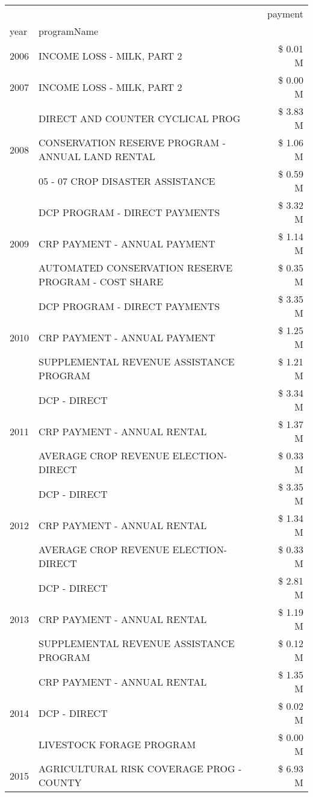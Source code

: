 \begin{tabular}{llr}
\toprule
 &  & payment \\
year & programName &  \\
\midrule
2006 & INCOME LOSS - MILK, PART 2 & \$ 0.01 M \\
\cline{1-3}
2007 & INCOME LOSS - MILK, PART 2 & \$ 0.00 M \\
\cline{1-3}
\multirow[t]{3}{*}{2008} & DIRECT AND COUNTER CYCLICAL PROG & \$ 3.83 M \\
 & CONSERVATION RESERVE PROGRAM - ANNUAL LAND RENTAL & \$ 1.06 M \\
 & 05 - 07 CROP DISASTER ASSISTANCE & \$ 0.59 M \\
\cline{1-3}
\multirow[t]{3}{*}{2009} & DCP PROGRAM - DIRECT PAYMENTS & \$ 3.32 M \\
 & CRP PAYMENT - ANNUAL PAYMENT & \$ 1.14 M \\
 & AUTOMATED CONSERVATION RESERVE PROGRAM - COST SHARE & \$ 0.35 M \\
\cline{1-3}
\multirow[t]{3}{*}{2010} & DCP PROGRAM - DIRECT PAYMENTS & \$ 3.35 M \\
 & CRP PAYMENT - ANNUAL PAYMENT & \$ 1.25 M \\
 & SUPPLEMENTAL REVENUE ASSISTANCE PROGRAM & \$ 1.21 M \\
\cline{1-3}
\multirow[t]{3}{*}{2011} & DCP - DIRECT & \$ 3.34 M \\
 & CRP PAYMENT - ANNUAL RENTAL & \$ 1.37 M \\
 & AVERAGE CROP REVENUE ELECTION-DIRECT & \$ 0.33 M \\
\cline{1-3}
\multirow[t]{3}{*}{2012} & DCP - DIRECT & \$ 3.35 M \\
 & CRP PAYMENT - ANNUAL RENTAL & \$ 1.34 M \\
 & AVERAGE CROP REVENUE ELECTION-DIRECT & \$ 0.33 M \\
\cline{1-3}
\multirow[t]{3}{*}{2013} & DCP - DIRECT & \$ 2.81 M \\
 & CRP PAYMENT - ANNUAL RENTAL & \$ 1.19 M \\
 & SUPPLEMENTAL REVENUE ASSISTANCE PROGRAM & \$ 0.12 M \\
\cline{1-3}
\multirow[t]{3}{*}{2014} & CRP PAYMENT - ANNUAL RENTAL & \$ 1.35 M \\
 & DCP - DIRECT & \$ 0.02 M \\
 & LIVESTOCK FORAGE PROGRAM & \$ 0.00 M \\
\cline{1-3}
\multirow[t]{3}{*}{2015} & AGRICULTURAL RISK COVERAGE PROG - COUNTY & \$ 6.93 M \\

\end{tabular}
